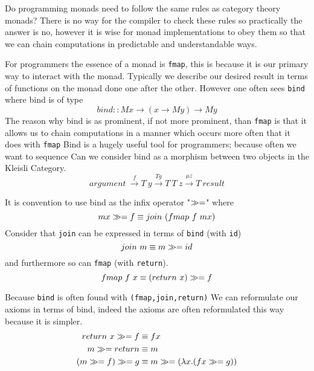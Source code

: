 Do programming monads need to follow the same rules as category theory monads?
There is no way for the compiler to check these rules so practically the answer is no,
however it is wise for monad implementations to obey them so that
we can chain computations in predictable and understandable ways.

For programmers the essence of a monad is \texttt{fmap},
this is because it is our primary way to interact with the monad.
Typically we describe our desired result in terms of functions on the monad
done one after the other.
However one often sees \texttt{bind} where bind is of type
\begin{equation}
    bind :: M x \rightarrow (x \rightarrow M y) \rightarrow M y
\end{equation}
The reason why bind is as prominent,
if not more prominent, than \texttt{fmap}
is that it allows us to chain computations in a manner
which occurs more often that it does with \texttt{fmap}
Bind is a hugely useful tool for programmers;
because often we want to sequence
Can we consider bind as a morphism between two objects in the Kleisli Category.
\begin{equation}
    argument\
    \stackrel{f}{\rightarrow}     T\ y
    \stackrel{T g}{\rightarrow}   T\ T\ z
    \stackrel{\mu z}{\rightarrow} T\ result
\end{equation}

It is convention to use bind as the infix operator "$\gg=$" where
\begin{equation}
    mx \gg= f \equiv join\ (fmap\ f\ mx)
\end{equation}
Consider that \texttt{join} can be expressed in terms of \texttt{bind} (with \texttt{id})
\begin{equation}
    join\ m \equiv m \gg= id
\end{equation}
and furthermore so can \texttt{fmap} (with \texttt{return}).
\begin{equation}
    fmap\ f\ x \equiv (return\ x) \gg= f
\end{equation}

Because \texttt{bind} is often found with \texttt{(fmap,join,return)}
We can reformulate our axioms in terms of bind,
indeed the axioms are often reformulated this way because it is simpler.
\begin{equation}
  \begin{split}
        return\ x \gg= f &\equiv f x \\
           m \gg= return &\equiv m   \\
      (m \gg= f) \gg= g &\equiv m \gg= (\lambda x.(fx \gg= g))
  \end{split}
\end{equation}


